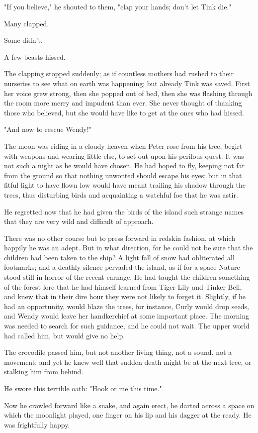 "If you believe," he shouted to them, "clap your hands; don't let Tink
die."


Many clapped.


Some didn't.


A few beasts hissed.


The clapping stopped suddenly; as if countless mothers had rushed to their
nurseries to see what on earth was happening; but already Tink was saved.
First her voice grew strong, then she popped out of bed, then she was
flashing through the room more merry and impudent than ever. She never
thought of thanking those who believed, but she would have like to get at
the ones who had hissed.


"And now to rescue Wendy!"


The moon was riding in a cloudy heaven when Peter rose from his tree,
begirt with weapons and wearing little else, to set out upon his
perilous quest. It was not such a night as he would have chosen. He had
hoped to fly, keeping not far from the ground so that nothing unwonted
should escape his eyes; but in that fitful light to have flown low would
have meant trailing his shadow through the trees, thus disturbing birds
and acquainting a watchful foe that he was astir.


He regretted now that he had given the birds of the island such strange
names that they are very wild and difficult of approach.


There was no other course but to press forward in redskin fashion, at
which happily he was an adept. But in what direction, for he
could not be sure that the children had been taken to the ship? A light
fall of snow had obliterated all footmarks; and a deathly silence pervaded
the island, as if for a space Nature stood still in horror of the recent
carnage. He had taught the children something of the forest lore that he
had himself learned from Tiger Lily and Tinker Bell, and knew that in
their dire hour they were not likely to forget it. Slightly, if he had an
opportunity, would blaze the trees, for instance, Curly
would drop seeds, and Wendy would leave her handkerchief at some important
place. The morning was needed to search for such guidance, and he could
not wait. The upper world had called him, but would give no help.


The crocodile passed him, but not another living thing, not a sound, not a
movement; and yet he knew well that sudden death might be at the next
tree, or stalking him from behind.


He swore this terrible oath: "Hook or me this time."


Now he crawled forward like a snake, and again erect, he darted across a
space on which the moonlight played, one finger on his lip and his dagger
at the ready. He was frightfully happy.

